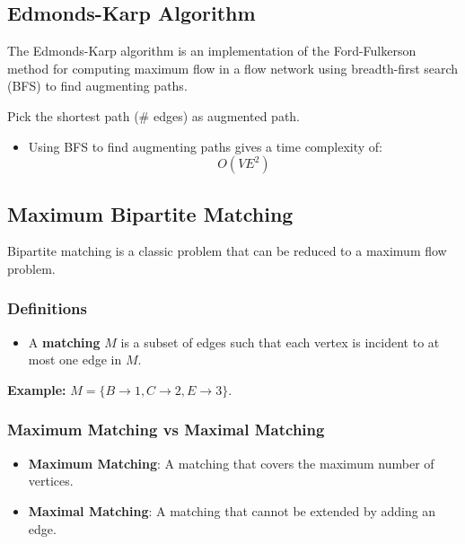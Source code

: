 \subsection{Edmonds-Karp Algorithm}
\begin{algo}
    The Edmonds-Karp algorithm is an implementation of the Ford-Fulkerson method for computing maximum flow in a flow network using breadth-first search (BFS) to find augmenting paths.
    \vspace{1em}

    Pick the shortest path (\# edges) as augmented path.

    \begin{itemize}
        \item Using BFS to find augmenting paths gives a time complexity of:
        \[
        O(V E^2)
        \]
    \end{itemize}
\end{algo}

\subsection{Maximum Bipartite Matching}
\begin{definition}
    Bipartite matching is a classic problem that can be reduced to a maximum flow problem.
\end{definition}

\subsubsection{Definitions}
\begin{definition}
    \begin{itemize}
        \item A \textbf{matching} $M$ is a subset of edges such that each vertex is incident to at most one edge in $M$.
    \end{itemize}
\end{definition}

\begin{example}
    \textbf{Example:} $M = \{B \rightarrow 1, C \rightarrow 2, E \rightarrow 3\}$.
\end{example}

\subsubsection{Maximum Matching vs Maximal Matching}
\begin{definition}
    \begin{itemize}
        \item \textbf{Maximum Matching}: A matching that covers the maximum number of vertices.
        \item \textbf{Maximal Matching}: A matching that cannot be extended by adding an edge.
    \end{itemize}
\end{definition}


